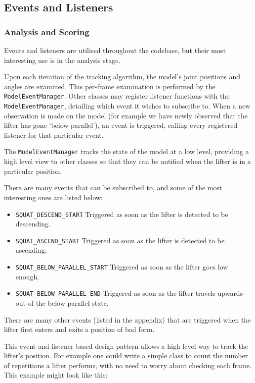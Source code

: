 \subsection{Events and Listeners}
\label{sec:listeners}

\subsubsection{Analysis and Scoring}

Events and listeners are utilised throughout the codebase, but their most interesting use is in the analysis stage.

Upon each iteration of the tracking algorithm, the model's joint positions and angles are examined. This per-frame examination is performed by the \texttt{ModelEventManager}. Other classes may register listener functions with the \texttt{ModelEventManager}, detailing which event it wishes to subscribe to. When a new observation is made on the model (for example we have newly observed that the lifter has gone `below parallel'), an event is triggered, calling every registered listener for that particular event.

The \texttt{ModelEventManager} tracks the state of the model at a low level, providing a high level view to other classes so that they can be notified when the lifter is in a particular position.

There are many events that can be subscribed to, and some of the most interesting ones are listed below:

\begin{itemize}
	\item \texttt{SQUAT\_DESCEND\_START} Triggered as soon as the lifter is detected to be descending.
	\item \texttt{SQUAT\_ASCEND\_START} Triggered as soon as the lifter is detected to be ascending.
	\item \texttt{SQUAT\_BELOW\_PARALLEL\_START} Triggered as soon as the lifter goes low enough.
	\item \texttt{SQUAT\_BELOW\_PARALLEL\_END} Triggered as soon as the lifter travels upwards out of the below parallel state.
\end{itemize}

There are many other events (listed in the appendix) that are triggered when the lifter first enters and exits a position of bad form.

This event and listener based design pattern allows a high level way to track the lifter's position. For example one could write a simple class to count the number of repetitions a lifter performs, with no need to worry about checking each frame. This example might look like this:

